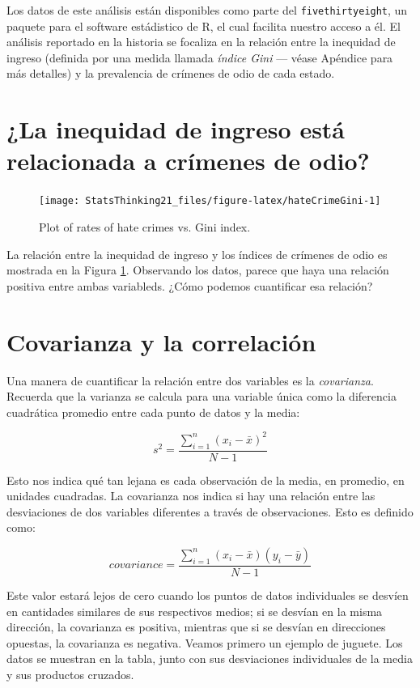 \documentclass[
  12pt,
]{book}
\theoremstyle{definition}
\theoremstyle{definition}
\theoremstyle{definition}
\theoremstyle{remark}
\begin{document}
Los datos de este análisis están disponibles como parte del \texttt{fivethirtyeight}, un paquete para el software estádistico de R, el cual facilita nuestro acceso a él. El análisis reportado en la historia se focaliza en la relación entre la inequidad de ingreso (definida por una medida llamada \emph{índice Gini} --- véase Apéndice para más detalles) y la prevalencia de crímenes de odio de cada estado.

\hypertarget{la-inequidad-de-ingreso-estuxe1-relacionada-a-cruxedmenes-de-odio}{%
\section{¿La inequidad de ingreso está relacionada a crímenes de odio?}\label{la-inequidad-de-ingreso-estuxe1-relacionada-a-cruxedmenes-de-odio}}

\begin{figure}
\texttt{[image: StatsThinking21\_files/figure-latex/hateCrimeGini-1]} \caption{Plot of rates of hate crimes vs. Gini index.}\label{fig:hateCrimeGini}
\end{figure}

La relación entre la inequidad de ingreso y los índices de crímenes de odio es mostrada en la Figura \ref{fig:hateCrimeGini}.
Observando los datos, parece que haya una relación positiva entre ambas variableds. ¿Cómo podemos cuantificar esa relación?

\hypertarget{covariance-and-correlation}{%
\section{Covarianza y la correlación}\label{covariance-and-correlation}}

Una manera de cuantificar la relación entre dos variables es la \emph{covarianza}. Recuerda que la varianza se calcula para una variable única como la diferencia cuadrática promedio entre cada punto de datos y la media:

\[
s^2 = \frac{\sum_{i=1}^n (x_i - \bar{x})^2}{N - 1}
\]

Esto nos indica qué tan lejana es cada observación de la media, en promedio, en unidades cuadradas. La covarianza nos indica si hay una relación entre las desviaciones de dos variables diferentes a través de observaciones. Esto es definido como:

\[
covariance = \frac{\sum_{i=1}^n (x_i - \bar{x})(y_i - \bar{y})}{N - 1}
\]

Este valor estará lejos de cero cuando los puntos de datos individuales se desvíen en cantidades similares de sus respectivos medios; si se desvían en la misma dirección, la covarianza es positiva, mientras que si se desvían en direcciones opuestas, la covarianza es negativa. Veamos primero un ejemplo de juguete. Los datos se muestran en la tabla, junto con sus desviaciones individuales de la media y sus productos cruzados.
\end{document}
